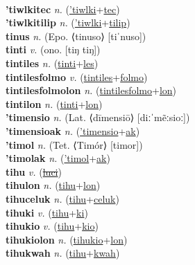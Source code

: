  \label{'tiwlkimentilip} \\
\textbf{'tiwlkitec} \textit{n.} (\hyperref['tiwlki]{'tiwlki}+\hyperref[tec]{tec})
 \label{'tiwlkitec} \\
\textbf{'tiwlkitilip} \textit{n.} (\hyperref['tiwlki]{'tiwlki}+\hyperref[tilip]{tilip})
 \label{'tiwlkitilip} \\
\textbf{tinus} \textit{n.} (Epo. ⟨tinuso⟩ [tiˈnuso])
 \label{tinus} \\
\textbf{tinti} \textit{v.} (ono. [tiŋ tiŋ])
 \label{tinti} \\
\textbf{tintiles} \textit{n.} (\hyperref[tinti]{tinti}+\hyperref[les]{les})
 \label{tintiles} \\
\textbf{tintilesfolmo} \textit{v.} (\hyperref[tintiles]{tintiles}+\hyperref[folmo]{folmo})
 \label{tintilesfolmo} \\
\textbf{tintilesfolmolon} \textit{n.} (\hyperref[tintilesfolmo]{tintilesfolmo}+\hyperref[lon]{lon})
 \label{tintilesfolmolon} \\
\textbf{tintilon} \textit{n.} (\hyperref[tinti]{tinti}+\hyperref[lon]{lon})
 \label{tintilon} \\
\textbf{'timensio} \textit{n.} (Lat. ⟨dīmensiō⟩ [diːˈmẽːsioː])
 \label{'timensio} \\
\textbf{'timensioak} \textit{n.} (\hyperref['timensio]{'timensio}+\hyperref[ak]{ak})
 \label{'timensioak} \\
\textbf{'timol} \textit{n.} (Tet. ⟨Timór⟩ [timor])
 \label{'timol} \\
\textbf{'timolak} \textit{n.} (\hyperref['timol]{'timol}+\hyperref[ak]{ak})
 \label{'timolak} \\
\textbf{tihu} \textit{v.} (\hyperref[luci]{\sout{luci}})
 \label{tihu} \\
\textbf{tihulon} \textit{n.} (\hyperref[tihu]{tihu}+\hyperref[lon]{lon})
 \label{tihulon} \\
\textbf{tihuceluk} \textit{n.} (\hyperref[tihu]{tihu}+\hyperref[celuk]{celuk})
 \label{tihuceluk} \\
\textbf{tihuki} \textit{v.} (\hyperref[tihu]{tihu}+\hyperref[ki]{ki})
 \label{tihuki} \\
\textbf{tihukio} \textit{v.} (\hyperref[tihu]{tihu}+\hyperref[kio]{kio})
 \label{tihukio} \\
\textbf{tihukiolon} \textit{n.} (\hyperref[tihukio]{tihukio}+\hyperref[lon]{lon})
 \label{tihukiolon} \\
\textbf{tihukwah} \textit{n.} (\hyperref[tihu]{tihu}+\hyperref[kwah]{kwah})
 \label{tihukwah} \\
